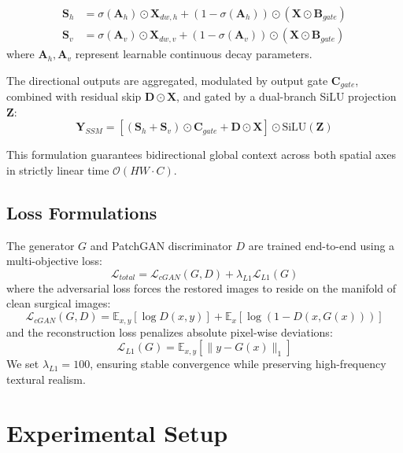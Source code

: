 \documentclass[conference]{IEEEtran}
\begin{document}
\begin{align}
\mathbf{S}_h &= \sigma(\mathbf{A}_h) \odot \mathbf{X}_{dw, h} + (1 - \sigma(\mathbf{A}_h)) \odot (\mathbf{X} \odot \mathbf{B}_{gate}) \\
\mathbf{S}_v &= \sigma(\mathbf{A}_v) \odot \mathbf{X}_{dw, v} + (1 - \sigma(\mathbf{A}_v)) \odot (\mathbf{X} \odot \mathbf{B}_{gate})
\end{align}
where $\mathbf{A}_h, \mathbf{A}_v$ represent learnable continuous decay parameters.

The directional outputs are aggregated, modulated by output gate $\mathbf{C}_{gate}$, combined with residual skip $\mathbf{D} \odot \mathbf{X}$, and gated by a dual-branch SiLU projection $\mathbf{Z}$:
\begin{equation}
\mathbf{Y}_{SSM} = \left[(\mathbf{S}_h + \mathbf{S}_v) \odot \mathbf{C}_{gate} + \mathbf{D} \odot \mathbf{X}\right] \odot \text{SiLU}(\mathbf{Z})
\end{equation}

This formulation guarantees bidirectional global context across both spatial axes in strictly linear time $\mathcal{O}(HW \cdot C)$.

\subsection{Loss Formulations}
The generator $G$ and PatchGAN discriminator $D$ are trained end-to-end using a multi-objective loss:
\begin{equation}
\mathcal{L}_{total} = \mathcal{L}_{cGAN}(G, D) + \lambda_{L1} \mathcal{L}_{L1}(G)
\end{equation}
where the adversarial loss forces the restored images to reside on the manifold of clean surgical images:
\begin{equation}
\mathcal{L}_{cGAN}(G, D) = \mathbb{E}_{x, y}[\log D(x, y)] + \mathbb{E}_{x}[\log (1 - D(x, G(x)))]
\end{equation}
and the reconstruction loss penalizes absolute pixel-wise deviations:
\begin{equation}
\mathcal{L}_{L1}(G) = \mathbb{E}_{x, y}\left[\|y - G(x)\|_1\right]
\end{equation}
We set $\lambda_{L1} = 100$, ensuring stable convergence while preserving high-frequency textural realism.

\section{Experimental Setup}
\end{document}
